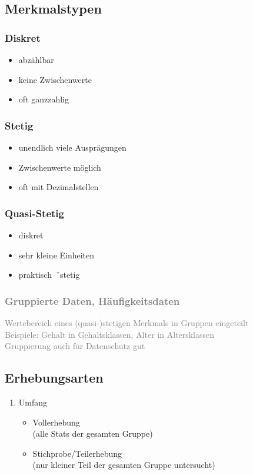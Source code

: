 \documentclass[10pt,a4paper,landscape]{article}
\begin{document}
\begin{multicols}{4}
\subsection{Merkmalstypen}

\subsubsection*{Diskret}
\begin{itemize}
\item abzählbar
\item keine Zwischenwerte
\item oft ganzzahlig
\end{itemize}

\subsubsection*{Stetig}
\begin{itemize}
\item unendlich viele Ausprägungen
\item Zwischenwerte möglich
\item oft mit Dezimalstellen
\end{itemize}

\subsubsection*{Quasi-Stetig}
\begin{itemize}
\item diskret
\item sehr kleine Einheiten
\item \glqq praktisch\grqq~¨stetig
\end{itemize}

\textcolor{gray}{
\subsubsection*{Gruppierte Daten, Häufigkeitsdaten}
Wertebereich eines (quasi-)stetigen Merkmals in Gruppen eingeteilt\\
Beispiele: Gehalt in Gehaltsklassen, Alter in Altersklassen\\
Gruppierung auch für Datenschutz gut
}

\subsection*{Erhebungsarten}
\begin{enumerate}
\item Umfang
\begin{itemize}
\item Vollerhebung\\
	(alle Stats der gesamten Gruppe)
\item Stichprobe/Teilerhebung\\
	(nur kleiner Teil der gesamten Gruppe untersucht)
\end{itemize}


\end{enumerate}
\end{multicols}
\end{document}
